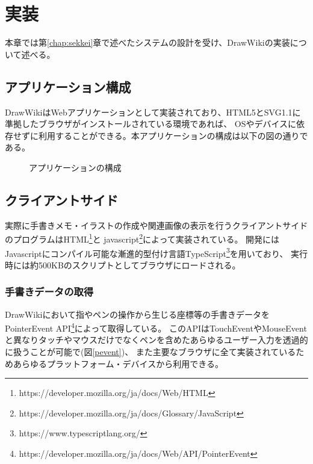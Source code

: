 \chapter{実装}
\label{chap:zissou}

本章では第\ref{chap:sekkei}章で述べたシステムの設計を受け、DrawWikiの実装について述べる。

\newpage

\section{アプリケーション構成}
DrawWikiはWebアプリケーションとして実装されており、HTML5とSVG1.1に準拠したブラウザがインストールされている環境であれば、
OSやデバイスに依存せずに利用することができる。本アプリケーションの構成は以下の図の通りである。

\begin{figure}[htbp]
    \begin{center}
         \end{center}
    \caption{アプリケーションの構成}
\end{figure}

\section{クライアントサイド}
実際に手書きメモ・イラストの作成や関連画像の表示を行うクライアントサイドのプログラムはHTML\footnote{https://developer.mozilla.org/ja/docs/Web/HTML}と
javascript\footnote{https://developer.mozilla.org/ja/docs/Glossary/JavaScript}によって実装されている。
開発にはJavascriptにコンパイル可能な漸進的型付け言語TypeScript\footnote{https://www.typescriptlang.org/}を用いており、
実行時には約500KBのスクリプトとしてブラウザにロードされる。


\subsection{手書きデータの取得}
DrawWikiにおいて指やペンの操作から生じる座標等の手書きデータをPointerEvent API\footnote{https://developer.mozilla.org/ja/docs/Web/API/PointerEvent}によって取得している。
このAPIはTouchEventやMouseEventと異なりタッチやマウスだけでなくペンを含めたあらゆるユーザー入力を透過的に扱うことが可能で(図\ref{pevent})、
また主要なブラウザに全て実装されているためあらゆるプラットフォーム・デバイスから利用できる。

